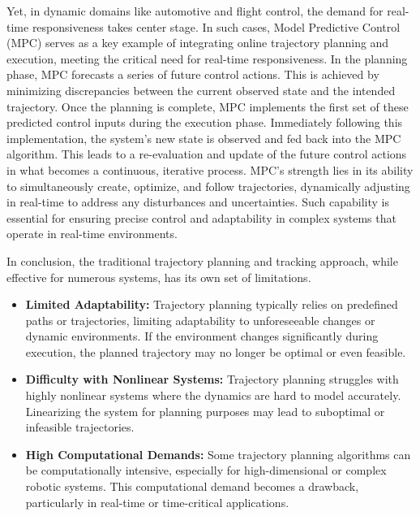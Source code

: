 Yet, in dynamic domains like automotive and flight control, the demand for real-time responsiveness takes center stage. In such cases, Model Predictive Control (MPC)\cite{kouvaritakis2016model} serves as a key example of integrating online trajectory planning and execution, meeting the critical need for real-time responsiveness. In the planning phase, MPC forecasts a series of future control actions. This is achieved by minimizing discrepancies between the current observed state and the intended trajectory. Once the planning is complete, MPC implements the first set of these predicted control inputs during the execution phase. Immediately following this implementation, the system's new state is observed and fed back into the MPC algorithm. This leads to a re-evaluation and update of the future control actions in what becomes a continuous, iterative process. MPC's strength lies in its ability to simultaneously create, optimize, and follow trajectories, dynamically adjusting in real-time to address any disturbances and uncertainties. Such capability is essential for ensuring precise control and adaptability in complex systems that operate in real-time environments.

In conclusion, the traditional trajectory planning and tracking approach, while effective for numerous systems, has its own set of limitations.

\begin{itemize}
    \item \textbf{Limited Adaptability:} 
    Trajectory planning typically relies on predefined paths or trajectories, limiting adaptability to unforeseeable changes or dynamic environments. If the environment changes significantly during execution, the planned trajectory may no longer be optimal or even feasible.
        
    \item \textbf{Difficulty with Nonlinear Systems:} 
    Trajectory planning struggles with highly nonlinear systems where the dynamics are hard to model accurately. Linearizing the system for planning purposes may lead to suboptimal or infeasible trajectories.
    
    \item \textbf{High Computational Demands:} 
    Some trajectory planning algorithms can be computationally intensive, especially for high-dimensional or complex robotic systems. This computational demand becomes a drawback, particularly in real-time or time-critical applications.
\end{itemize}

